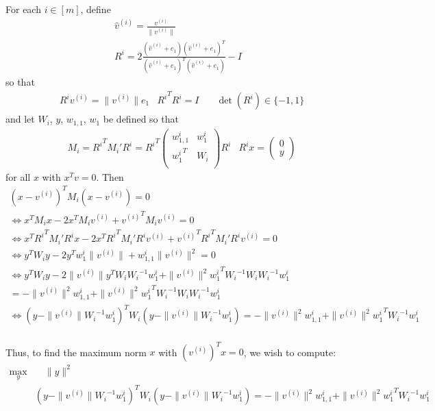 \documentclass{article}
\theoremstyle{case}
\numberwithin{theorem}{subsection}
\begin{document}
For each $i \in [m]$, define
\begin{align*}
\hat v^{(i)} = \frac{v^{(i)}}{\|v^{(i)}\|} \\
R^i = 2\frac{(\hat v^{(i)} + e_1)(\hat v^{(i)} + e_1)^T}{(\hat v^{(i)} + e_1)^T(\hat v^{(i)} + e_1)} - I
\end{align*}
so that
\begin{align*}
& {R^i}v^{(i)} = \|v^{(i)}\|e_1 & {R^i}^T{R^i} = I & \quad \det({R^i}) \in \{-1, 1\}
\end{align*}
and let $W_i$, $y$, $w_{1,1}$, $w_1$ be defined so that
\begin{align*}
& M_i = {R^i}^T M_i' {R^i} = {R^i}^T\left( \begin{array}{cc}
{w_{1,1}^i} & {w_1^i} \\
{w_1^i}^T	& {W_i}  \\
\end{array} \right){R^i} &
{R^i}x = \left(\begin{array}{c}
0 \\
y
\end{array}\right)
\end{align*}
for all $x$ with $x^Tv = 0$.
Then
\begin{align*}
\left(x - {v^{(i)}}\right)^TM_i\left(x - {v^{(i)}}\right) = 0 \\
\Longleftrightarrow x^TM_ix - 2x^TM_i{v^{(i)}} + {v^{(i)}}^TM_i{v^{(i)}} = 0 \\
\Longleftrightarrow x^T{R^i}^TM_i'{R^i}x - 2x^T{R^i}^TM_i'{R^i}{v^{(i)}} + {v^{(i)}}^T{R^i}^TM_i'{R^i}{v^{(i)}} = 0 \\
\Longleftrightarrow y^T{W_i}y - 2y^T{w_1^i}\|v^{(i)}\| + {w_{1,1}^i}\|v^{(i)}\|^2 = 0 \\
\Longleftrightarrow y^T{W_i}y - 2\|v^{(i)}\|y^T{W_i}{W_i}^{-1}{w_1^i} + \|v^{(i)}\|^2{{w_1^i}}^T{W_i}^{-1}{W_i}{W_i}^{-1}{w_1^i} \\
= - \|v^{(i)}\|^2{w_{1,1}^i} + \|v^{(i)}\|^2{{w_1^i}}^T{W_i}^{-1}{W_i}{W_i}^{-1}{w_1^i} \\
\Longleftrightarrow \left(y - \|v^{(i)}\|{W_i}^{-1}{w_1^i}\right)^T{W_i}\left(y - \|v^{(i)}\|{W_i}^{-1}{w_1^i}\right) = - \|v^{(i)}\|^2{w_{1,1}^i} + \|v^{(i)}\|^2{{{w_1^i}}}^T{W_i}^{-1}{{w_1^i}} \\
\end{align*}

Thus, to find the maximum norm $x$ with $\left(v^{(i)}\right)^Tx = 0$, we wish to compute:
\begin{align*}
\max_{y} & \quad \|y\|^2  \\
 & \left(y - \|v^{(i)}\|{W_i}^{-1}{w_1^i}\right)^T{W_i}\left(y - \|v^{(i)}\|{W_i}^{-1}{w_1^i}\right) = - \|v^{(i)}\|^2{w_{1,1}^i} + \|v^{(i)}\|^2{{w_1^i}}^T{W_i}^{-1}{w_1^i}
\end{align*}
\end{document}
